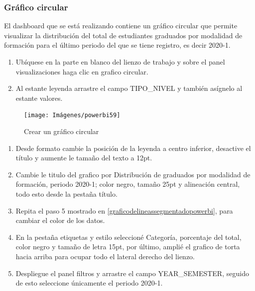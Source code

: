 \documentclass[
]{book}
\begin{document}
\hypertarget{gruxe1fico-circular}{%
\subsubsection{Gráfico circular}\label{gruxe1fico-circular}}

El dashboard que se está realizando contiene un gráfico circular que permite visualizar la distribución del total de estudiantes graduados por modalidad de formación para el último periodo del que se tiene registro, es decir 2020-1.

\begin{enumerate}
\def\labelenumi{\arabic{enumi}.}
\item
  Ubíquese en la parte en blanco del lienzo de trabajo y sobre el panel visualizaciones haga clic en grafico circular.
\item
  Al estante leyenda arrastre el campo TIPO\_NIVEL y también asígnelo al estante valores.
\end{enumerate}

\begin{figure}

{\centering \texttt{[image: Imágenes/powerbi59]} 

}

\caption{Crear un gráfico circular}\label{fig:paso2circular-fig}
\end{figure}

\begin{enumerate}
\def\labelenumi{\arabic{enumi}.}
\setcounter{enumi}{2}
\item
  Desde formato cambie la posición de la leyenda a centro inferior, desactive el título y aumente le tamaño del texto a 12pt.
\item
  Cambie le titulo del grafico por Distribución de graduados por modalidad de formación, periodo 2020-1; color negro, tamaño 25pt y alineación central, todo esto desde la pestaña título.
\item
  Repita el paso 5 mostrado en \ref{graficodelineassegmentadopowerbi}, para cambiar el color de los datos.
\item
  En la pestaña etiquetas y estilo seleccioné Categoría, porcentaje del total, color negro y tamaño de letra 15pt, por último, amplié el grafico de torta hacia arriba para ocupar todo el lateral derecho del lienzo.
\item
  Despliegue el panel filtros y arrastre el campo YEAR\_SEMESTER, seguido de esto seleccione únicamente el periodo 2020-1.
\end{enumerate}
\end{document}
